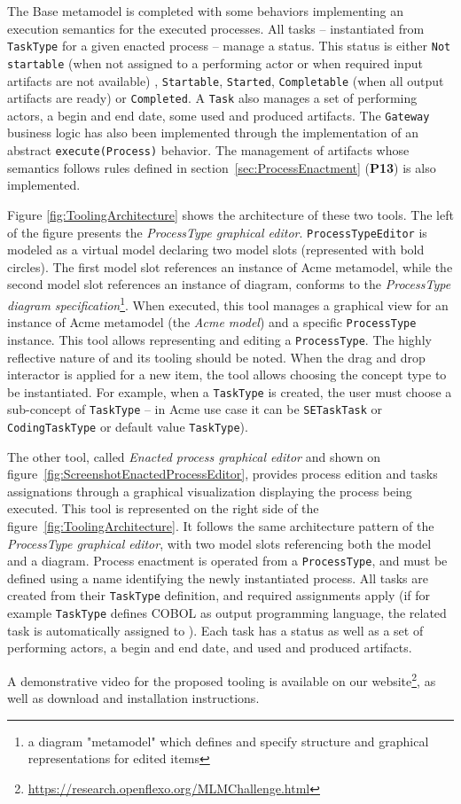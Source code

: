 The Base metamodel is completed with some behaviors implementing an execution semantics for the executed processes. All tasks -- instantiated from \texttt{TaskType} for a given enacted process -- manage a status. This status is either \texttt{Not startable} (when not assigned to a performing actor or when required input artifacts are not available) , \texttt{Startable}, \texttt{Started}, \texttt{Completable} (when all output artifacts are ready) or \texttt{Completed}. A \texttt{Task} also manages a set of performing actors, a begin and end date, some used and produced artifacts. The \texttt{Gateway} business logic has also been implemented through the implementation of an abstract \texttt{execute(Process)} behavior. The management of artifacts whose semantics follows rules defined in section~\ref{sec:ProcessEnactment} (\textbf{P13}) is also implemented.

Figure \ref{fig:ToolingArchitecture} shows the architecture of these two tools.
 The left of the figure presents the \textit{ProcessType graphical editor}. \texttt{ProcessTypeEditor} is modeled as a virtual model declaring two model slots (represented with bold circles). The first model slot references an instance of Acme metamodel, while the second model slot references an instance of diagram, conforms to the \textit{ProcessType diagram specification}\footnote{a diagram "metamodel" which defines and specify structure and graphical representations for edited items}. When executed, this tool manages a graphical view for an instance of Acme metamodel (the \textit{Acme model}) and a specific \texttt{ProcessType} instance. This tool allows representing and editing a \texttt{ProcessType}. The highly reflective nature of \FML and its tooling should be noted. When the drag and drop interactor is applied for a new item, the tool allows choosing the concept type to be instantiated. For example, when a \texttt{TaskType} is created, the user must choose a sub-concept of \texttt{TaskType} -- in Acme use case it can be \texttt{SETaskTask} or \texttt{CodingTaskType} or default value \texttt{TaskType}).

The other tool, called \textit{Enacted process graphical editor} and shown on figure~\ref{fig:ScreenshotEnactedProcessEditor}, provides process edition and tasks assignations through a graphical visualization displaying the process being executed. This tool is represented on the right side of the figure~\ref{fig:ToolingArchitecture}. It follows the same architecture pattern of the \textit{ProcessType graphical editor}, with two model slots referencing both the model and a diagram. Process enactment is operated from a \texttt{ProcessType}, and must be defined using a name identifying the newly instantiated process. All tasks are created from their \texttt{TaskType} definition, and required assignments apply (if for example  \texttt{TaskType} defines COBOL as output programming language, the related task is automatically assigned to ). Each task has a status as well as a set of performing actors, a begin and end date, and used and produced artifacts.

A demonstrative video for the proposed tooling is available on our website\footnote{\url{https://research.openflexo.org/MLMChallenge.html}}, as well as download and installation instructions.
